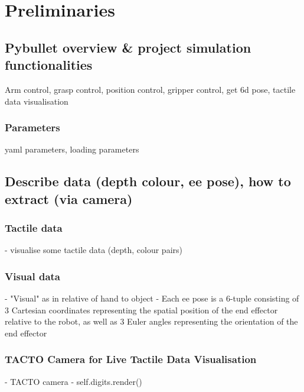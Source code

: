 \documentclass[11pt, a4paper]{report}
\begin{document}
\chapter{Preliminaries}
\label{chap:3}


\section{Pybullet overview & project simulation functionalities}
Arm control, grasp control, position control, gripper control, get 6d pose, tactile data visualisation

\subsection{Parameters}
yaml parameters, loading parameters


\section{Describe data (depth colour, ee pose), how to extract (via camera)}


\subsection{Tactile data}
- visualise some tactile data (depth, colour pairs)


\subsection{Visual data}
- "Visual" as in relative of hand to object
- Each ee pose is a 6-tuple consisting of 3 Cartesian coordinates representing the spatial position of the end effector relative to the robot, as well as 3 Euler angles representing the orientation of the end effector

\subsection{}
\subsection{TACTO Camera for Live Tactile Data Visualisation}
\label{sec:}
- TACTO camera \cite{Wang2022TACTO}
- self.digits.render()



\end{document}
